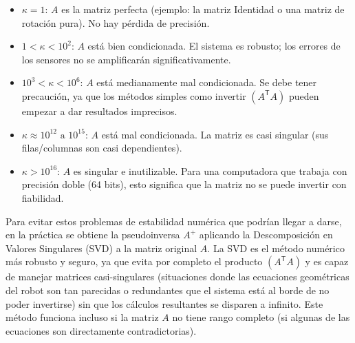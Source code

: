\documentclass[11pt,a4paper]{article}
\newcommand{\trans}{\mathsf{T}}      %
\begin{document}
\begin{itemize}
    \item \(\kappa = 1\): \(A\) es la matriz perfecta (ejemplo: la matriz Identidad o una matriz de rotación pura). No hay pérdida de precisión.
    \item \(1 < \kappa < 10^2\): \(A\) está bien condicionada. El sistema es robusto; los errores de los sensores no se amplificarán significativamente.
    \item \(10^3 < \kappa < 10^6\): \(A\) está medianamente mal condicionada. Se debe tener precaución, ya que los métodos simples como invertir \((A^{\trans}A)\) pueden empezar a dar resultados imprecisos.
    \item \(\kappa \approx 10^{12} \text{ a } 10^{15}\): \(A\) está mal condicionada. La matriz es casi singular (sus filas/columnas son casi dependientes).
    \item \(\kappa > 10^{16}\): \(A\) es singular e inutilizable. Para una computadora que trabaja con precisión doble (64 bits), esto significa que la matriz no se puede invertir con fiabilidad.
\end{itemize}

Para evitar estos problemas de estabilidad numérica que podrían llegar a darse, en la práctica se obtiene la pseudoinversa \(A^+\) aplicando la Descomposición en Valores Singulares (SVD) a la matriz original \(A\). La SVD es el método numérico más robusto y seguro, ya que evita por completo el producto \((A^{\trans}A)\) y es capaz de manejar matrices casi-singulares (situaciones donde las ecuaciones geométricas del robot son tan parecidas o redundantes que el sistema está al borde de no poder invertirse) sin que los cálculos resultantes se disparen a infinito. Este método funciona incluso si la matriz \(A\) no tiene rango completo (si algunas de las ecuaciones son directamente contradictorias).
\end{document}
